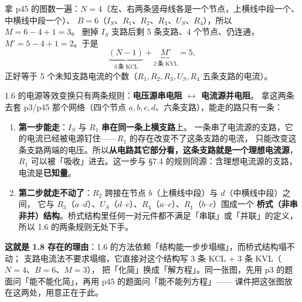 \documentclass[11pt]{ctexart}
\begin{document}
拿 p45 的图数一遍：$N=4$（左、右两条竖母线各是一个节点，上横线中段一个、中横线中段一个）、
$B=6$（$I_S$、$R_1$、$R_2$、$R_3$、$U_S$、$R_4$），所以 $M=6-4+1=3$。
删掉 $I_S$ 支路后剩 5 条支路、4 个节点、仍连通，$M'=5-4+1=2$。于是
\[ \underbrace{(N-1)}_{3\ \text{条 KCL}}+\underbrace{M'}_{2\ \text{条 KVL}}=5 , \]
正好等于 5 个未知支路电流的个数（$R_1,R_2,R_3,U_S,R_4$ 五条支路的电流）。


1.6 的电源等效变换只有两条规则：\textbf{电压源串电阻 $\leftrightarrow$ 电流源并电阻}。
拿这两条去套 p3/p45 那个网络（四个节点 $a,b,c,d$、六条支路），能走的路只有一条：

\begin{enumerate}
\item \textbf{第一步能走}：$I_S$ 与 $R_1$ \textbf{串在同一条上横支路}上。
一条串了电流源的支路，它的电流已经被电源钉住——$R_1$ 的存在改变不了这条支路的电流，
只能改变这条支路两端的电压。所以\textbf{从电路其它部分看，这条支路就是一个理想电流源}，
$R_1$ 可以被「吸收」进去。这一步与 §7.4 的规则同源：含理想电流源的支路，电流是\textbf{已知量}。
\item \textbf{第二步就走不动了}：$R_2$ 跨接在节点 $b$（上横线中段）与 $d$（中横线中段）之间，
它与 $R_3$（$a$--$d$）、$U_S$（$d$--$c$）、$R_4$（$a$--$c$）、$R_1$（$b$--$c$）围成一个
\textbf{桥式（非串非并）结构}。桥式结构里任何一对元件都不满足「串联」或「并联」的定义，
所以 1.6 的两条规则无处下手。
\end{enumerate}

\textbf{这就是 1.8 存在的理由}：1.6 的方法依赖「结构能一步步塌缩」，而桥式结构塌不动；
支路电流法不要求塌缩，它直接对这个结构写 $3$ 条 KCL $+$ $3$ 条 KVL（$N=4$、$B=6$、$M=3$），
把「化简」换成「解方程」。同一张图，先用 p3 的题面问「能不能化简」，再用 p45 的题面问「能不能列方程」——
课件把这张图放在这两处，用意正在于此。

\end{document}
